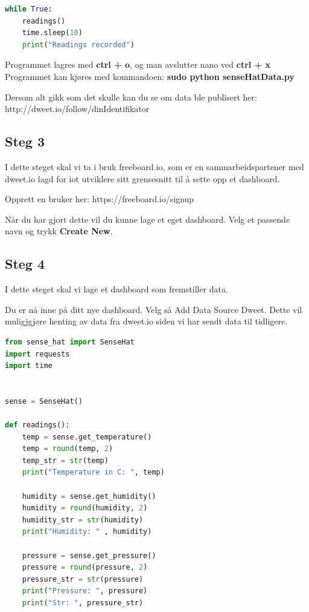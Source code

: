 \documentclass{article}
\begin{document}
\begin{appendices}
\begin{lstlisting}[language=Python, caption=ApendiX B del 4]
while True:
	readings()
	time.sleep(10)
	print("Readings recorded")
\end{lstlisting}
Programmet lagres med \textbf{ctrl + o}, og man avslutter nano ved \textbf{ctrl + x}
Programmet kan kjøres med kommandoen: \textbf{sudo python senseHatData.py}

Dersom alt gikk som det skulle kan du se om data ble publisert her: http://dweet.io/follow/dinIdentifikator

\subsection{Steg 3}

I dette steget skal vi ta i bruk freeboard.io, som er en sammarbeidspartener med dweet.io lagd for iot utviklere sitt grensesnitt til å sette opp et dashboard.

Opprett en bruker her: https://freeboard.io/signup

Når du har gjort dette vil du kunne lage et eget dashboard. Velg et passende navn og trykk \textbf{Create New}.

\subsection{Steg 4}

I dette steget skal vi lage et dashboard som fremstiller data.

Du er nå inne på ditt nye dashboard. Velg så Add  Data Source  Dweet. Dette vil muligjgjøre henting av data fra dweet.io siden vi har sendt data til tidligere. 

\begin{lstlisting}[language=Python, caption=Hvordan sende temperaturdata fra Raspberry Pi til Internett Fasit Kode]
from sense_hat import SenseHat
import requests
import time


sense = SenseHat()

def readings():
	temp = sense.get_temperature()
	temp = round(temp, 2)
	temp_str = str(temp)
	print("Temperature in C: ", temp)

	humidity = sense.get_humidity()
	humidity = round(humidity, 2)
	humidity_str = str(humidity)
	print("Humidity: " , humidity)

	pressure = sense.get_pressure()
	pressure = round(pressure, 2)
	pressure_str = str(pressure)
	print("Pressure: ", pressure)
	print("Str: ", pressure_str)


\end{lstlisting}
\end{appendices}
\end{document}
